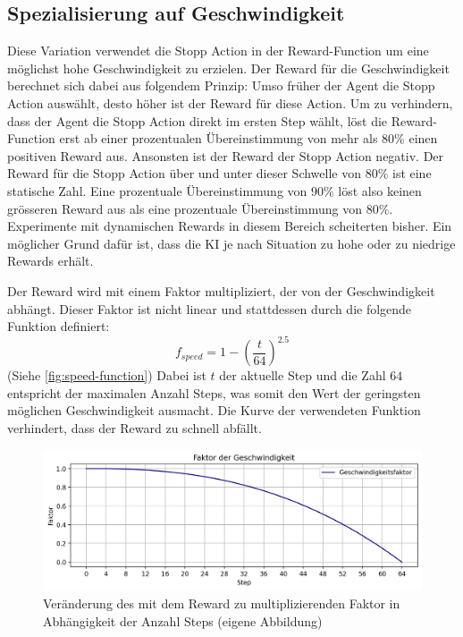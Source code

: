 \subsection{Spezialisierung auf Geschwindigkeit}\label{sub:m_var_speed} Diese
Variation verwendet die Stopp Action in der Reward-Function um eine möglichst
hohe Geschwindigkeit zu erzielen. Der Reward für die Geschwindigkeit berechnet
sich dabei aus folgendem Prinzip: Umso früher der Agent die Stopp Action
auswählt, desto höher ist der Reward für diese Action. Um zu verhindern, dass
der Agent die Stopp Action direkt im ersten Step wählt, löst die Reward-Function
erst ab einer prozentualen Übereinstimmung von mehr als $80\%$ einen positiven
Reward aus. Ansonsten ist der Reward der Stopp Action negativ. Der Reward für
die Stopp Action über und unter dieser Schwelle von $80\%$ ist eine statische
Zahl. Eine prozentuale Übereinstimmung von $90\%$ löst also keinen grösseren
Reward aus als eine prozentuale Übereinstimmung von $80\%$. Experimente mit
dynamischen Rewards in diesem Bereich scheiterten bisher. Ein möglicher Grund
dafür ist, dass die KI je nach Situation zu hohe oder zu niedrige Rewards
erhält.

Der Reward wird mit einem Faktor multipliziert, der von der Geschwindigkeit
abhängt. Dieser Faktor ist nicht linear und stattdessen durch die folgende Funktion definiert:
\[ f_{speed} = 1 - \left(\frac{t}{64}\right)^{2.5} \] (Siehe
\autoref{fig:speed-function}) Dabei ist $t$ der aktuelle Step und die Zahl $64$
entspricht der maximalen Anzahl Steps, was somit den Wert der geringsten
möglichen Geschwindigkeit ausmacht. Die Kurve der verwendeten Funktion
verhindert, dass der Reward zu schnell abfällt.

\begin{figure}[!ht]
    \centering
    \includegraphics[width=\textwidth]{images/methode/speedplot.png}
    \caption{Veränderung des mit dem Reward zu multiplizierenden Faktor in
    Abhängigkeit der Anzahl Steps (eigene
    Abbildung)}\label{fig:speed-function}
\end{figure}

